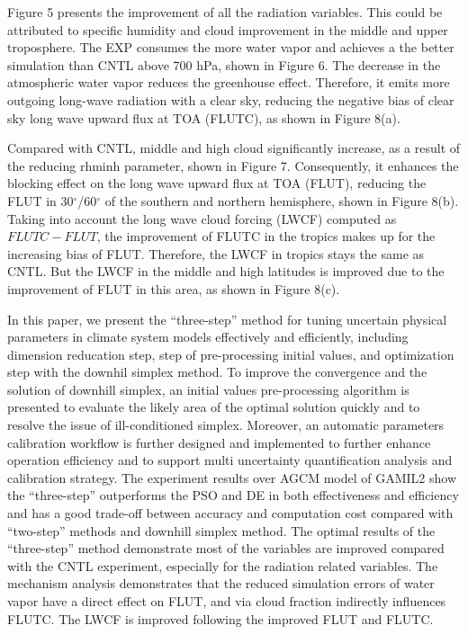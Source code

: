 \documentclass[gmd, manuscript]{copernicus}
\begin{document}
Figure 5 presents the improvement of all the radiation variables. This could be attributed to  specific humidity and cloud improvement in the middle and upper troposphere. The EXP consumes the more water vapor and achieves a the better simulation than CNTL above 700 hPa, shown in Figure 6. The decrease in the atmospheric water vapor reduces the greenhouse effect. Therefore, it emits more outgoing long-wave radiation with a clear sky, reducing the negative bias of clear sky long wave upward flux at TOA (FLUTC), as shown in Figure 8(a). 


Compared with CNTL, middle and high cloud significantly increase, as a result of the reducing rhminh parameter, shown in Figure 7. Consequently, it enhances the blocking effect on the long wave upward flux at TOA (FLUT), reducing the FLUT in 30$^\circ$/60$^\circ$ of the southern and northern hemisphere, shown in Figure 8(b). Taking into account the long wave cloud forcing (LWCF) computed as $FLUTC - FLUT$, the improvement of FLUTC in the tropics  makes up for the increasing bias of FLUT. Therefore, the LWCF in tropics stays the same as CNTL. But the LWCF in the middle and high latitudes is improved due to the improvement of FLUT in this area, as shown in Figure 8(c).


\conclusions  %

In this paper, we present the ``three-step'' method for tuning uncertain physical parameters in climate system models effectively and efficiently, including dimension reducation step, step of pre-processing initial values, and optimization step with the downhil simplex method. To improve the convergence and the solution of downhill simplex, an initial values pre-processing algorithm is presented to evaluate the likely area of the optimal solution quickly and to resolve the issue of ill-conditioned simplex. Moreover, an automatic parameters calibration workflow is further designed and implemented to further enhance operation efficiency and to support multi uncertainty quantification analysis and calibration strategy. The experiment results over AGCM model of GAMIL2 show the ``three-step'' outperforms the PSO and DE in both effectiveness and efficiency and has a good trade-off between accuracy and computation cost compared with ``two-step'' methods and downhill simplex method. The optimal results of the ``three-step'' method demonstrate most of the variables are improved compared with the CNTL experiment, especially for the radiation related variables. The mechanism analysis demonstrates that the reduced simulation errors of water  vapor have a direct effect on FLUT, and via cloud fraction indirectly influences FLUTC. The  LWCF is improved following the improved FLUT and FLUTC.
\end{document}
